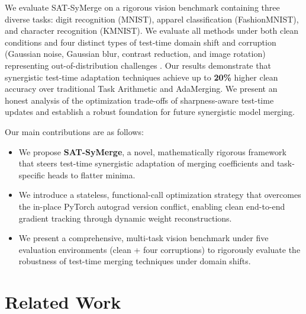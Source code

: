 \documentclass{article}
\begin{document}
We evaluate SAT-SyMerge on a rigorous vision benchmark containing three diverse tasks: digit recognition (MNIST), apparel classification (FashionMNIST), and character recognition (KMNIST). We evaluate all methods under both clean conditions and four distinct types of test-time domain shift and corruption (Gaussian noise, Gaussian blur, contrast reduction, and image rotation) representing out-of-distribution challenges \cite{hendrycks2019benchmarking}. Our results demonstrate that synergistic test-time adaptation techniques achieve up to \textbf{20\%} higher clean accuracy over traditional Task Arithmetic and AdaMerging. We present an honest analysis of the optimization trade-offs of sharpness-aware test-time updates and establish a robust foundation for future synergistic model merging.

Our main contributions are as follows:
\begin{itemize}
    \item We propose \textbf{SAT-SyMerge}, a novel, mathematically rigorous framework that steers test-time synergistic adaptation of merging coefficients and task-specific heads to flatter minima.
    \item We introduce a stateless, functional-call optimization strategy that overcomes the in-place PyTorch autograd version conflict, enabling clean end-to-end gradient tracking through dynamic weight reconstructions.
    \item We present a comprehensive, multi-task vision benchmark under five evaluation environments (clean + four corruptions) to rigorously evaluate the robustness of test-time merging techniques under domain shifts.
\end{itemize}

\section{Related Work}
\label{sec:related}
\end{document}

